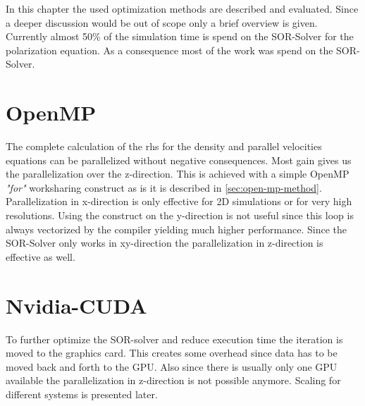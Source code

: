 \documentclass[master.tex]{subfiles}
\begin{document}
In this chapter the used optimization methods are described and evaluated. Since a deeper discussion would be out of scope only a brief overview is given. Currently almost 50\% of the simulation time is spend on the SOR-Solver for the polarization equation. As a consequence most of the work was spend on the SOR-Solver.
\section{OpenMP}
The complete calculation of the \ac{rhs} for the density and parallel velocities equations can be parallelized without negative consequences. Most gain gives us the parallelization over the z-direction. This is achieved with a simple OpenMP \textit{"for"} worksharing construct as is it is described in \autoref{sec:open-mp-method}. Parallelization in x-direction is only effective for 2D simulations or for very high resolutions. Using the construct on the y-direction is not useful since this loop is always vectorized by the compiler yielding much higher performance. Since the SOR-Solver only works in xy-direction the parallelization in z-direction is effective as well.

\section{Nvidia-CUDA}
To further optimize the SOR-solver and reduce execution time the iteration is moved to the graphics card. This creates some overhead since data has to be moved back and forth to the GPU. Also since there is usually only one GPU available the parallelization in z-direction is not possible anymore. Scaling for different systems is presented later.
\end{document}
